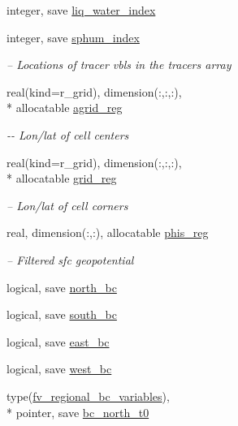 \begin{DoxyCompactItemize}
integer, save \hyperlink{classfv__regional__mod_a4d329cbebba02218379970b776449bbf}{liq\-\_\-water\-\_\-index}
\item 
integer, save \hyperlink{classfv__regional__mod_a5046c418bb3714689df7737b3024d910}{sphum\-\_\-index}
\begin{DoxyCompactList}\small\item\em -- Locations of tracer vbls in the tracers array \end{DoxyCompactList}\item 
real(kind=r\-\_\-grid), dimension(\-:,\-:,\-:), \\*
allocatable \hyperlink{classfv__regional__mod_a2eb428ec6f0a4e8830a8c379986c760c}{agrid\-\_\-reg}
\begin{DoxyCompactList}\small\item\em -\/-\/ Lon/lat of cell centers \end{DoxyCompactList}\item 
real(kind=r\-\_\-grid), dimension(\-:,\-:,\-:), \\*
allocatable \hyperlink{classfv__regional__mod_affa97bf1e197ce68252597eb38a2ebd7}{grid\-\_\-reg}
\begin{DoxyCompactList}\small\item\em -- Lon/lat of cell corners \end{DoxyCompactList}\item 
real, dimension(\-:,\-:), allocatable \hyperlink{classfv__regional__mod_a4360b9bea440884168e896f8c5ce3a4c}{phis\-\_\-reg}
\begin{DoxyCompactList}\small\item\em -- Filtered sfc geopotential \end{DoxyCompactList}\item 
logical, save \hyperlink{classfv__regional__mod_ab0d18e800d03af2331630c5d41f24647}{north\-\_\-bc}
\item 
logical, save \hyperlink{classfv__regional__mod_aa19455811e08a60979cfe82e9339cf79}{south\-\_\-bc}
\item 
logical, save \hyperlink{classfv__regional__mod_abba04d13f69846096203d294e6224476}{east\-\_\-bc}
\item 
logical, save \hyperlink{classfv__regional__mod_acb6bcb04c44ff52d6d5caa07da7952d2}{west\-\_\-bc}
\item 
type(\hyperlink{structfv__regional__mod_1_1fv__regional__bc__variables}{fv\-\_\-regional\-\_\-bc\-\_\-variables}), \\*
pointer, save \hyperlink{classfv__regional__mod_a764cc29c643f325faec13145036f9777}{bc\-\_\-north\-\_\-t0}

\end{DoxyCompactItemize}
